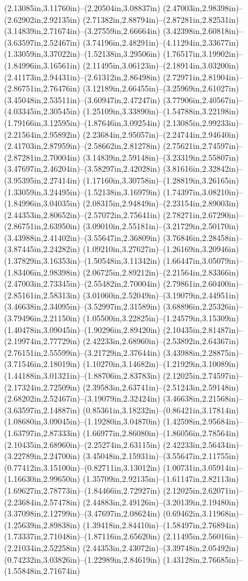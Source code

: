 (2.13085in,3.11760in)--(2.20504in,3.08837in) (2.47003in,2.98398in)--(2.62902in,2.92135in) (2.71382in,2.88794in)--(2.87281in,2.82531in) (3.14839in,2.71674in)--(3.27559in,2.66664in) (3.42398in,2.60818in)--(3.63597in,2.52467in) (3.74196in,2.48291in)--(4.11294in,2.33677in) (1.33059in,3.37022in)--(1.52138in,3.29506in) (1.76517in,3.19902in)--(1.84996in,3.16561in) (2.11495in,3.06123in)--(2.18914in,3.03200in) (2.41173in,2.94431in)--(2.61312in,2.86498in) (2.72971in,2.81904in)--(2.86751in,2.76476in) (3.12189in,2.66455in)--(3.25969in,2.61027in) (3.45048in,2.53511in)--(3.60947in,2.47247in) (3.77906in,2.40567in)--(4.03345in,2.30545in) (1.25109in,3.33890in)--(1.54788in,3.22198in) (1.79166in,3.12595in)--(1.87646in,3.09254in) (2.13085in,2.99233in)--(2.21564in,2.95892in) (2.23684in,2.95057in)--(2.24744in,2.94640in) (2.41703in,2.87959in)--(2.58662in,2.81278in) (2.75621in,2.74597in)--(2.87281in,2.70004in) (3.14839in,2.59148in)--(3.23319in,2.55807in) (3.47697in,2.46204in)--(3.58297in,2.42028in) (3.81616in,2.32842in)--(3.95395in,2.27414in) (1.17160in,3.30758in)--(1.28819in,3.26165in) (1.33059in,3.24495in)--(1.52138in,3.16979in) (1.74397in,3.08210in)--(1.84996in,3.04035in) (2.08315in,2.94849in)--(2.23154in,2.89003in) (2.44353in,2.80652in)--(2.57072in,2.75641in) (2.78271in,2.67290in)--(2.86751in,2.63950in) (3.09010in,2.55181in)--(3.21729in,2.50170in) (3.43988in,2.41402in)--(3.55647in,2.36809in) (3.76846in,2.28458in)--(3.87445in,2.24282in) (1.09210in,3.27627in)--(1.26169in,3.20946in) (1.37829in,3.16353in)--(1.50548in,3.11342in) (1.66447in,3.05079in)--(1.83406in,2.98398in) (2.06725in,2.89212in)--(2.21564in,2.83366in) (2.47003in,2.73345in)--(2.55482in,2.70004in) (2.79861in,2.60400in)--(2.85161in,2.58313in) (3.01060in,2.52049in)--(3.19079in,2.44951in) (3.46638in,2.34095in)--(3.52997in,2.31589in) (3.68896in,2.25326in)--(3.79496in,2.21150in) (1.05500in,3.22825in)--(1.24579in,3.15309in) (1.40478in,3.09045in)--(1.90296in,2.89420in) (2.10435in,2.81487in)--(2.19974in,2.77729in) (2.42233in,2.68960in)--(2.53892in,2.64367in) (2.76151in,2.55599in)--(3.21729in,2.37644in) (3.43988in,2.28875in)--(3.71546in,2.18019in) (1.10270in,3.14682in)--(1.21929in,3.10089in) (1.44188in,3.01321in)--(1.88706in,2.83783in) (2.12025in,2.74597in)--(2.17324in,2.72509in) (2.39583in,2.63741in)--(2.51243in,2.59148in) (2.68202in,2.52467in)--(3.19079in,2.32424in) (3.46638in,2.21568in)--(3.63597in,2.14887in) (0.85361in,3.18232in)--(0.86421in,3.17814in) (1.08680in,3.09045in)--(1.19280in,3.04870in) (1.42598in,2.95684in)--(1.63797in,2.87333in) (1.66977in,2.86080in)--(1.86056in,2.78564in) (2.10435in,2.68960in)--(2.25274in,2.63115in) (2.42233in,2.56434in)--(3.22789in,2.24700in) (3.45048in,2.15931in)--(3.55647in,2.11755in) (0.77412in,3.15100in)--(0.82711in,3.13012in) (1.00731in,3.05914in)--(1.16630in,2.99650in) (1.35709in,2.92135in)--(1.61147in,2.82113in) (1.69627in,2.78773in)--(1.84466in,2.72927in) (2.12025in,2.62071in)--(2.23684in,2.57478in) (2.44883in,2.49126in)--(3.20139in,2.19480in) (3.37098in,2.12799in)--(3.47697in,2.08624in) (0.69462in,3.11968in)--(1.25639in,2.89838in) (1.39418in,2.84410in)--(1.58497in,2.76894in) (1.73337in,2.71048in)--(1.87116in,2.65620in) (2.11495in,2.56016in)--(2.21034in,2.52258in) (2.44353in,2.43072in)--(3.39748in,2.05492in) (0.74232in,3.03826in)--(1.22989in,2.84619in) (1.43128in,2.76685in)--(1.55848in,2.71674in) 